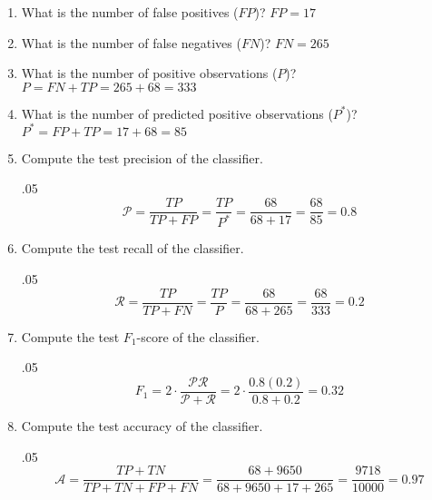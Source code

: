 \documentclass[11pt,twoside]{article}
\newcommand{\pts}[1]{\marginpar{ \small\hspace{0pt} \textit{[#1]} } }
\newcommand{\?}{\stackrel{?}{=}}
\newcommand{\fr}{\frac}
\newcommand{\bl}{\color{blue}}
\newenvironment{solution}{\begin{adjustwidth}{.05\textwidth}{}\bl}{\medskip\end{adjustwidth}}
\begin{document}
\begin{enumerate}[\bf (a)]

\item What is \pts{1} the number of false positives ($FP$)? {\bl $FP = 17$}

\item What is \pts{1} the number of false negatives ($FN$)? {\bl $FN = 265$}

\item What is \pts{1} the number of positive observations ($P$)? {\bl $P = FN + TP =  265 + 68 = 333$}
  
\item What is \pts{1} the number of predicted positive  observations ($P^{*}$)? {\bl $P^{*} = FP + TP =  17 + 68 = 85$}
  
\item Compute the test precision of the classifier. \pts{2} 
  \begin{solution}
    \begin{equation*}
      \mathcal{P} = \fr{TP}{TP + FP} = \fr{TP}{P^{*}} = \fr{68}{68 + 17} = \fr{68}{85} = \boxed{0.8}
    \end{equation*}
  \end{solution}
  
\item Compute the test recall of the classifier. \pts{2} 
  \begin{solution}
    \begin{equation*}
      \mathcal{R} = \fr{TP}{TP + FN} = \fr{TP}{P} = \fr{68}{68 + 265} = \fr{68}{333} = \boxed{0.2}
    \end{equation*}
  \end{solution}
  
\item Compute the test $F_1$-score of the classifier. \pts{2}
    \begin{solution}
    \begin{equation*}
    F_{1} =2 \cdot \fr{\mathcal{P}\mathcal{R}}{\mathcal{P} + \mathcal{R}} =2\cdot\fr{0.8(0.2)}{0.8 + 0.2} =  \boxed{0.32}
    \end{equation*}
  \end{solution}
  
\item Compute the test \pts{2}  accuracy of the classifier.
  \begin{solution}
    \begin{equation*}
      \mathcal{A} = \fr{TP + TN}{TP + TN + FP + FN} = \fr{68+9650}{68+9650+17+265} = \fr{9718}{10000} = \boxed{0.97}
    \end{equation*}
  \end{solution}
\end{enumerate}
\end{document}

